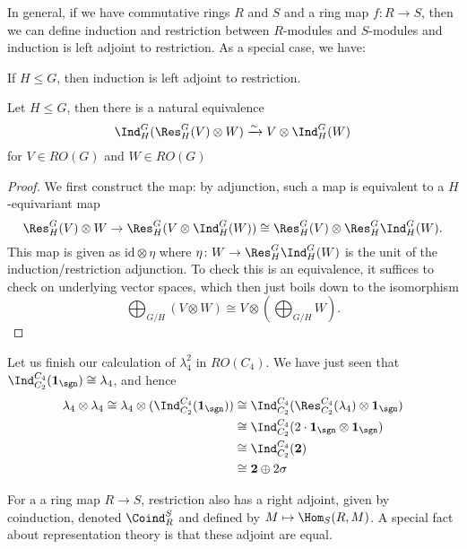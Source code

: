\documentclass{willowtreebook}
\begin{document}
    In general, if we have commutative rings $R$ and $S$ and a ring map $f \colon R \to S$, then we can define induction and restriction between $R$-modules and $S$-modules and induction is left adjoint to restriction. As a special case, we have:
    \begin{lemma}
        If $H \le G$, then induction is left adjoint to restriction. 
    \end{lemma}
\begin{proposition}
        Let $H \le G$, then there is a natural equivalence
        \[
        \Ind_H^G(\Res^G_H(V) \otimes W) \xrightarrow{\sim} V \otimes \Ind_H^G(W)
        \]
        for $V \in RO(G)$ and $W \in RO(G)$
    \end{proposition}
    \begin{proof}
        We first construct the map: by adjunction, such a map is equivalent to a $H$-equivariant map
        \[
        \Res^G_H(V) \otimes W \to \Res^G_H(V \otimes \Ind_H^G(W)) \cong \Res^G_H(V) \otimes \Res^G_H \Ind_H^G(W).
        \]
     This map is given as $\text{id} \otimes \eta$ where $\eta \colon W \to \Res^G_H \Ind_H^G(W)$ is the unit of the induction/restriction adjunction. To check this is an equivalence, it suffices to check on underlying vector spaces, which then just boils down to the isomorphism
     \[
     \bigoplus_{G/H}(V \otimes W) \cong V \otimes (\bigoplus_{G/H}W). 
     \]
    \end{proof}
    \begin{example}
        Let us finish our calculation of $\lambda_4^2$ in $RO(C_4)$. We have just seen that $\Ind_{C_2}^{C_4}(\mathbf{1}_{\sgn}) \cong \lambda_4$, and hence 
        \[
        \begin{split}
        \lambda_4 \otimes \lambda_4 \cong \lambda_4 \otimes (\Ind_{C_2}^{C_4}(\mathbf{1}_{\sgn})) &\cong \Ind_{C_2}^{C_4}(\Res^{C_4}_{C_2}(\lambda_4) \otimes \mathbf{1}_{\sgn}) \\
        &\cong \Ind_{C_2}^{C_4}(2 \cdot \mathbf{1}_{\sgn} \otimes \mathbf{1}_{\sgn}) \\& \cong \Ind_{C_2}^{C_4}(\mathbf{2})
        \\& \cong \mathbf{2} \oplus 2 \sigma
        \end{split}
        \]
    \end{example}
    For a a ring map $R \to S$, restriction also has a right adjoint, given by coinduction, denoted $\Coind_R^S$ and defined by $M \mapsto \Hom_S(R,M)$. A special fact about representation theory is that these adjoint are equal. 
\end{document}
